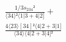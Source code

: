 \documentclass[varwidth, border=5pt]{standalone}
\begin{document}
\begin{my}
$\begin{gathered}
\scriptscriptstyle\frac{1/3s_{234}²}{⟨34⟩²⟨1|3+4|2]} +\\
\scriptscriptstyle\frac{4⟨23⟩[34]²⟨4|2+3|1]}{⟨34⟩⟨4|2+3|4]²} \phantom{+}
\end{gathered}$
\end{my}
\end{document}

